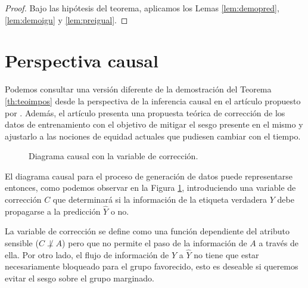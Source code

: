 \documentclass[oneside,openright,titlepage,numbers=noenddot,openany,headinclude,footinclude=true,
cleardoublepage=empty,abstractoff,BCOR=5mm,paper=a4,fontsize=12pt,main=spanish]{scrreprt}
\begin{document}
\begin{proof}
Bajo las hipótesis del teorema, aplicamos los Lemas \ref{lem:demopred}, \ref{lem:demoigu} y \ref{lem:preigual}.
\end{proof}

\section{Perspectiva causal}

Podemos consultar una versión diferente de la demostración del Teorema \ref{th:teoimpos} desde la perspectiva de la inferencia causal en el artículo propuesto por \cite{impossibilityth2021}. Además, el artículo presenta una propuesta teórica de corrección de los datos de entrenamiento con el objetivo de mitigar el sesgo presente en el mismo y ajustarlo a las nociones de equidad actuales que pudiesen cambiar con el tiempo.\\

\begin{figure}[h]
\centering
{}
\caption{Diagrama causal con la variable de corrección.}
\label{fig:varcorrect}
\end{figure}

El diagrama causal para el proceso de generación de datos puede representarse entonces, como podemos observar en la Figura \ref{fig:varcorrect}, introduciendo una variable de corrección $C$ que determinará si la información de la etiqueta verdadera $Y$ debe propagarse a la predicción $\hat{Y}$ o no. 

La variable de corrección se define como una función dependiente del atributo sensible ($C \not\perp A$) pero que no permite el paso de la información de $A$ a través de ella. Por otro lado, el flujo de información de $Y$ a $\hat{Y}$ no tiene que estar necesariamente bloqueado para el grupo favorecido, esto es deseable si queremos evitar el sesgo sobre el grupo marginado.\\
\end{document}
